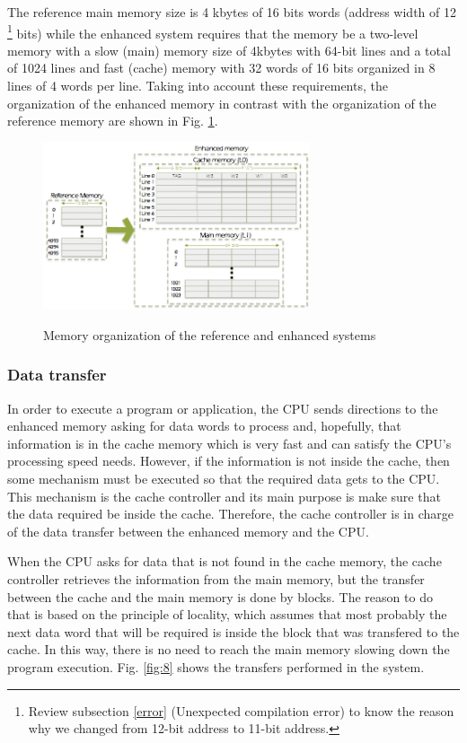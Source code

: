 \documentclass[]{article}
\begin{document}
The reference main memory size is 4 kbytes of 16 bits words (address width of 12 \footnote{Review subsection \ref{error} (Unexpected compilation error) to know the reason why we changed from 12-bit address to 11-bit address.}
bits) while the enhanced system requires that the memory be a two-level memory with a slow (main) memory size of 4kbytes with 64-bit lines and a total of 1024 lines and fast (cache) memory with 32 words of 16 bits organized in 8 lines of 4
words per line. Taking into account these requirements, the organization of the enhanced memory in contrast with the organization of the reference memory are shown in Fig. \ref{fig:7}.

\begin{figure}[!ht]
	\caption{Memory organization of the reference and enhanced systems}
	\centering
	\includegraphics[width=0.7\textwidth]{memory}
	\label{fig:7}
\end{figure}

\subsubsection{Data transfer}

In order to execute a program or application, the CPU sends directions to the enhanced memory asking for data words to process and, hopefully, that information is in the cache memory which is very fast and can satisfy the CPU's processing speed needs. However, if the information is not inside the cache, then some mechanism must be executed so that the required data gets to the CPU. This mechanism is the cache controller and its main purpose is make sure that the data required be inside the cache. Therefore, the cache controller is in charge of the data transfer between the enhanced memory and the CPU.

When the CPU asks for data that is not found in the cache memory, the cache controller retrieves the information from the main memory, but the transfer between the cache and the main memory is done by blocks. The reason to do that is based on the principle of locality, which assumes that most probably the next data word that will be required is inside the block that was transfered to the cache. In this way, there is no need to reach the main memory slowing down the program execution. Fig. \ref{fig:8} shows the transfers performed in the system.
\end{document}
